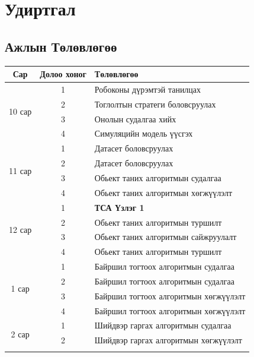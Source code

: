 \chapter{Удиртгал}

\pagestyle{plain}
\setcounter{page}{1}

\section{Ажлын Төлөвлөгөө}

\begin{table}[h]
    \centering
    \begin{tabular}{|c|c|l|}
        \hline
        Сар & Долоо хоног & Төлөвлөгөө \\ \hline
        \multirow{4}{*}{10 сар} & 1 & Робоконы дүрэмтэй танилцах \\ \cline{2-3}
        & 2 & Тоглолтын стратеги боловсруулах \\ \cline{2-3}
        & 3 & Онолын судалгаа хийх \\ \cline{2-3}
        & 4 & Симуляцийн модель үүсгэх \\ \hline
        \multirow{4}{*}{11 сар} & 1 & Датасет боловсруулах \\ \cline{2-3}
        & 2 & Датасет боловсруулах \\ \cline{2-3}
        & 3 & Обьект таних алгоритмын судалгаа \\ \cline{2-3}
        & 4 & Обьект таних алгоритмын хөгжүүлэлт \\ \hline
        \multirow{4}{*}{12 сар} & 1 & \textbf{ТСА Үзлэг 1} \\ \cline{2-3}
        & 2 & Обьект таних алгоритмын туршилт \\ \cline {2-3}
        & 3 & Обьект таних алгоритмын сайжруулалт \\ \cline {2-3}
        & 4 & Обьект таних алгоритмын туршилт \\ \hline
        \multirow{4}{*}{1 сар} & 1 & Байршил тогтоох алгоритмын судалгаа \\ \cline{2-3}
        & 2 & Байршил тогтоох алгоритмын судалгаа \\ \cline{2-3}
        & 3 & Байршил тогтоох алгоритмын хөгжүүлэлт \\ \cline{2-3}
        & 4 & Байршил тогтоох алгоритмын хөгжүүлэлт \\ \hline
        \multirow{4}{*}{2 сар} & 1 & Шийдвэр гаргах алгоритмын судалгаа \\ \cline{2-3}
        & 2 & Шийдвэр гаргах алгоритмын хөгжүүлэлт \\ \cline{2-3}

\end{tabular}
\end{table}
